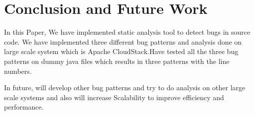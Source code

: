 \documentclass[sigplan,screen]{acmart}
\begin{document}
\section{Conclusion and Future Work}
In this Paper, We have implemented static analysis tool to detect bugs in source code. We have implemented three different bug patterns and analysis done on large scale system which is Apache CloudStack.Have tested all the three bug patterns on dummy java files which results in three patterns with the line numbers.

In future, will develop other bug patterns and try to do analysis on other large scale systems and also will increase Scalability to improve efficiency and performance.



\end{document}
